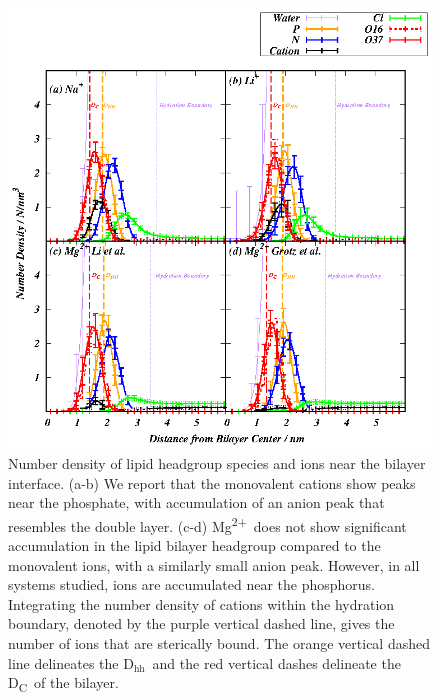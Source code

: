 \documentclass[journal=langd5,manuscript=article]{achemso}
\newcommand{\mg}{Mg\textsuperscript{2+}~}
\newcommand{\dhh}{$\text{D}_\text{hh}$}
\begin{document}
\clearpage
\begin{figure}
    \caption{Number density of lipid headgroup species and
    ions near the bilayer interface. (a-b) We report that the 
    monovalent cations show peaks near the phosphate, with
    accumulation of an anion peak that resembles the double layer.
    (c-d) \mg does not show significant accumulation in the 
    lipid bilayer headgroup compared to the monovalent ions,
    with a similarly small anion peak. However, in all systems
    studied, ions are accumulated near the phosphorus.
    Integrating the number density of cations within the hydration boundary,
    denoted by the purple vertical dashed line, gives the number of ions that are
    sterically bound. The orange vertical dashed line delineates the \dhh~and the 
    red vertical dashes
delineate the D\textsubscript{C}~of the bilayer.}
    \label{fig:dens}
    \includegraphics[width=\textwidth]{Figure_4.eps}
\end{figure}
\clearpage
\end{document}
